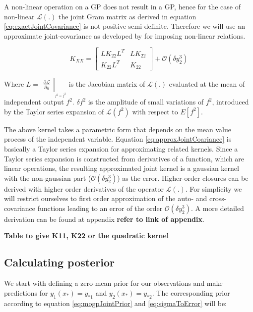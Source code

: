 A non-linear operation on a GP does not result in a GP, hence for the case of non-linear \(\mathcal{L}\left ( . \right )\) the joint Gram matrix as derived in equation \ref{eq:exactJointCovariance} is not positive semi-definite.  Therefore we will use an approximate joint-covariance as developed by  \cite{Constantinescu2013} for imposing non-linear relations.

\begin{equation}\label{eq:approxJointCoariance}
K_{XX} = 
\begin{bmatrix}
LK_{22}L^{T} & LK_{22}\\ K_{22}L^{T} & K_{22}
\end{bmatrix} + \mathcal{O}\left ( \delta y_{2}^{3} \right )
\end{equation}

\noindent Where \(L = \left.\begin{matrix}
\frac{\partial \mathcal{L}}{\partial y} 
\end{matrix}\right|_{_{f^{2} = \bar{f}^{2}}} \) is the Jacobian matrix of \(\mathcal{L}\left ( . \right )\) evaluated at the mean of independent output \(f^{2}\). \(\delta f^{2}\) is the amplitude of small variations of \(f^{2}\), introduced by the Taylor series expansion of \(\mathcal{L}(f^2)\) with respect to \(E[f^{2}]\). 

The above kernel takes a parametric form that depends on the mean value process of the independent variable. Equation \ref{eq:approxJointCoariance} is basically a Taylor series expansion for approximating related kernels. Since a Taylor series expansion is constructed from derivatives of a function, which are linear operations, the resulting approximated joint kernel is a gaussian kernel with the non-gaussian part ($\mathcal{O}\left ( \delta y_{2}^{3} \right )$) as the error. Higher-order closures can be derived with higher order derivatives of the operator \(\mathcal{L}(.)\). For simplicity we will restrict ourselves to first order approximation of the auto- and cross-covariance functions leading to an error of the order \(\mathcal{O}\left ( \delta y_{2}^{3} \right )\).  A more detailed derivation can be found at appendix \textbf{refer to link of appendix}. 

\textbf{Table to give K11, K22 or the quadratic kernel}


\subsection{Calculating posterior}\label{sub:MOGPs}
We start with defining a zero-mean prior for our observations and make predictions for \(y_{1}\left ( x_{*} \right ) = y_{*1}\) and \(y_{2}\left ( x_{*} \right ) = y_{*2}\). The corresponding prior according to equation \ref{eq:mogpJointPrior} and \ref{eq:sigmaToError} will be:
 
